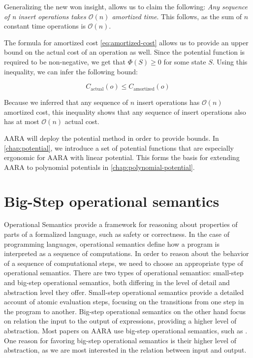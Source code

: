 Generalizing the new won insight, allows us to claim the following: \emph{Any sequence of n insert operations takes \(\mathcal{O}(n)\) amortized time}. This follows, as the sum of \(n\) constant time operations is \(\mathcal{O}(n)\). 

The formula for amortized cost \ref{eq:amortized-cost} allows us to provide an upper bound on the actual cost of an operation as well. Since the potential function is required to be non-negative, we get that \(\Phi(S) \geq 0\) for some state \(S\). Using this inequality, we can infer the following bound: 

\[C_{\text{actual}}(o) \leq C_{\text{amortized}}(o)\]
\label{ineq:actual-amortized}

Because we inferred that any sequence of \(n\) insert operations has \(\mathcal{O}(n)\) amortized cost, this inequality shows that any sequence of insert operations also has at most \(\mathcal{O}(n)\) actual cost.

AARA will deploy the potential method in order to provide bounds. In \ref{chap:potential}, we introduce a set of potential functions that are especially ergonomic for AARA with linear potential.
This forms the basis for extending AARA to polynomial potentials in \ref{chap:polynomial-potential}.

\section{Big-Step operational semantics}
Operational Semantics provide a framework for reasoning about properties of parts of a formalized language, such as safety or correctness. In the case of programming languages, operational semantics define how a program is interpreted as a sequence of computations. In order to reason about the behavior of a sequence of computational steps, we need to choose an appropriate type of operational semantics.
There are two types of operational semantics: small-step and big-step operational semantics, both differing in the level of detail and abstraction level they offer. Small-step operational semantics provide a detailed account of atomic evaluation steps, focusing on the transitions from one step in the program to another. Big-step operational semantics on the other hand focus on relation the input to the output of expressions, providing a higher level of abstraction. Most papers on AARA use big-step operational semantics, such as . One reason for favoring big-step operational semantics is their higher level of abstraction, as we are most interested in the relation between input and output.

